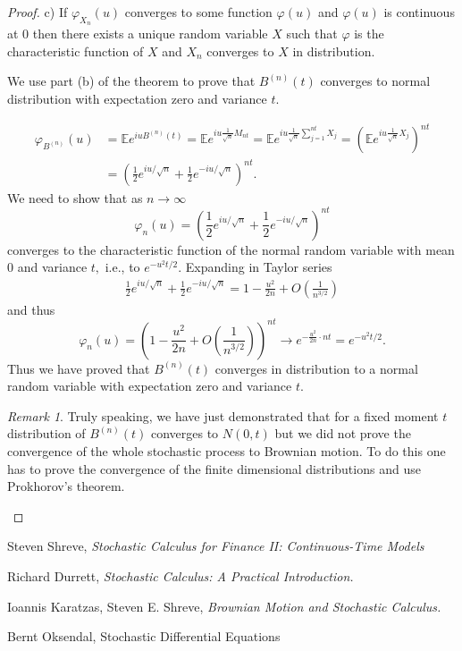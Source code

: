 \documentclass[reqno,psamsfonts, 10pt]{amsart}
\theoremstyle{remark}
\newtheorem{rem}[thm]{Remark}
\begin{document}
\begin{proof}
c) If $\varphi_{X_n}(u)$ converges to some function
$\varphi(u)$ and $\varphi(u)$ is continuous at $0$ then
there exists a unique random variable $X$ such that
$\varphi$ is the characteristic function of $X$ and $X_n$
converges to $X$ in distribution.


We use part (b) of the theorem to prove that $B^{(n)}(t)$
converges to normal distribution with expectation zero and
variance $t.$

\begin{align}
\varphi_{B^{(n)}}(u) & = \mathbb{E} e^{i u B^{(n)}(t)} =
\mathbb{E} e^{i u \frac{1}{\sqrt{n}} M_{nt} } = \mathbb{E}
e^{i u \frac{1}{\sqrt{n}} \sum \limits_{j=1}^{nt} X_j } =
\left(\mathbb{E} e^{i u \frac{1}{\sqrt{n}} X_j
}\right)^{nt} \nonumber \\
& = \left(\frac{1}{2} e^{i u /\sqrt{n}} + \frac{1}{2}
e^{-iu/\sqrt{n}}\right)^{nt}.
\end{align}
We need to show that as $n \to \infty$
$$
\varphi_n(u) = \left(\frac{1}{2} e^{i u /\sqrt{n}} +
\frac{1}{2} e^{-iu/\sqrt{n}}\right)^{nt}
$$
converges to the characteristic function of the normal
random variable with mean $0$ and variance $t,$ i.e., to
$e^{-u^2 t/2}.$ Expanding in Taylor series
\begin{align}
\frac{1}{2} e^{i u /\sqrt{n}} + \frac{1}{2}
e^{-iu/\sqrt{n}} = 1 - \frac{u^2}{2n} +
O(\frac{1}{n^{3/2}})
\end{align}
and thus
$$
\varphi_n(u) = \left(1 - \frac{u^2}{2n} +
O(\frac{1}{n^{3/2}})\right)^{nt} \to e^{-\frac{u^2}{2n}
\cdot nt} = e^{-u^2 t/2}.
$$
Thus we have proved that $B^{(n)}(t)$ converges in
distribution to a normal random variable with expectation
zero and variance $t.$

\begin{rem} Truly speaking, we have just demonstrated that
for a fixed moment $t$ distribution of $B^{(n)}(t)$
converges to $N(0,t)$ but we did not prove the convergence
of the whole stochastic process to Brownian motion. To do
this one has to prove the convergence of the finite
dimensional distributions and use Prokhorov's theorem.
\end{rem}
\end{proof}




\begin{thebibliography}{1}

 Steven Shreve, \textit{Stochastic Calculus for Finance II:
Continuous-Time Models}

 Richard Durrett, \textit{Stochastic Calculus: A Practical Introduction.}

 Ioannis Karatzas, Steven E. Shreve, \textit{Brownian Motion and Stochastic Calculus.}

 Bernt Oksendal, Stochastic Differential Equations
\end{thebibliography}
\end{document}
